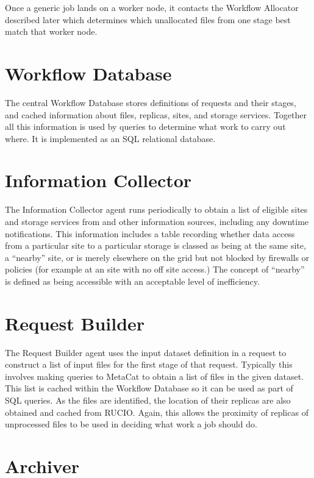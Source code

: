 \documentclass[../main-v1.tex]{subfiles}
\begin{document}
Once a generic job lands on a worker node, it contacts the Workflow Allocator described later which determines which unallocated files from one stage best match that worker node.

\section{Workflow Database}
\label{sec:flow:wfdb}

The central Workflow Database stores definitions of requests and their stages, and cached information about files, replicas, sites, and storage services. Together all this information is used by queries to determine what work to carry out where. It is implemented as an SQL relational database.

\section{Information Collector}
\label{sec:flow:collector}

The Information Collector agent runs periodically to obtain a list of eligible sites and storage services from  and other information sources, including any downtime notifications. This information includes a table recording whether data access from a particular site to a particular storage is classed as being at the same site, a ``nearby'' site, or is merely elsewhere on the grid but not blocked by firewalls or policies (for example at an  site with no off site access.) The concept of ``nearby'' is defined as being accessible with an acceptable level of inefficiency.

\section{Request Builder}
\label{sec:flow:builder}

The Request Builder agent uses the input dataset definition in a request to construct a list of input files for the first stage of that request. Typically this involves making queries to MetaCat to obtain a list of files in the given dataset. This list is cached within the Workflow Database so it can be used as part of SQL queries. As the files are identified, the location of their replicas are also obtained and cached from RUCIO. Again, this allows the proximity of replicas of unprocessed files to be used in deciding what work a job should do.

\section{Archiver}
\label{sec:flow:archiver}
\end{document}
